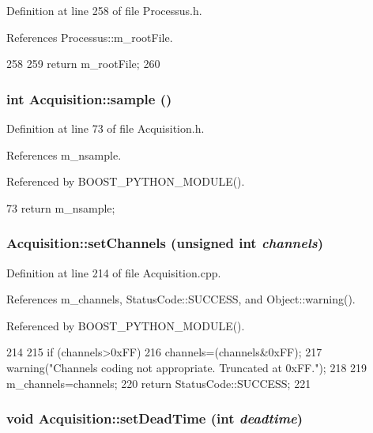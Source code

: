 Definition at line 258 of file Processus.h.

References Processus::m\_\-rootFile.


\begin{DoxyCode}
258                      {
259     return m_rootFile;
260   }
\end{DoxyCode}
\hypertarget{classAcquisition_a83181975c0746e5837d53933031e7b62}{
\subsubsection[{sample}]{\setlength{\rightskip}{0pt plus 5cm}int Acquisition::sample ()}}
\label{classAcquisition_a83181975c0746e5837d53933031e7b62}


Definition at line 73 of file Acquisition.h.

References m\_\-nsample.

Referenced by BOOST\_\-PYTHON\_\-MODULE().


\begin{DoxyCode}
73 {return m_nsample;}
\end{DoxyCode}
\hypertarget{classAcquisition_a3ee93f665573b4622bd9cba92c0cc04e}{
\subsubsection[{setChannels}]{ Acquisition::setChannels (unsigned int {\em channels})}}
\label{classAcquisition_a3ee93f665573b4622bd9cba92c0cc04e}


Definition at line 214 of file Acquisition.cpp.

References m\_\-channels, StatusCode::SUCCESS, and Object::warning().

Referenced by BOOST\_\-PYTHON\_\-MODULE().


\begin{DoxyCode}
214                                                          {
215   if (channels>0xFF){
216     channels=(channels&0xFF);
217     warning("Channels coding not appropriate. Truncated at 0xFF.");
218   }
219   m_channels=channels;
220   return StatusCode::SUCCESS;
221 }
\end{DoxyCode}
\hypertarget{classAcquisition_a37e05315fc47958c290a7d938c61e067}{
\subsubsection[{setDeadTime}]{\setlength{\rightskip}{0pt plus 5cm}void Acquisition::setDeadTime (int {\em deadtime})}}
\label{classAcquisition_a37e05315fc47958c290a7d938c61e067}



